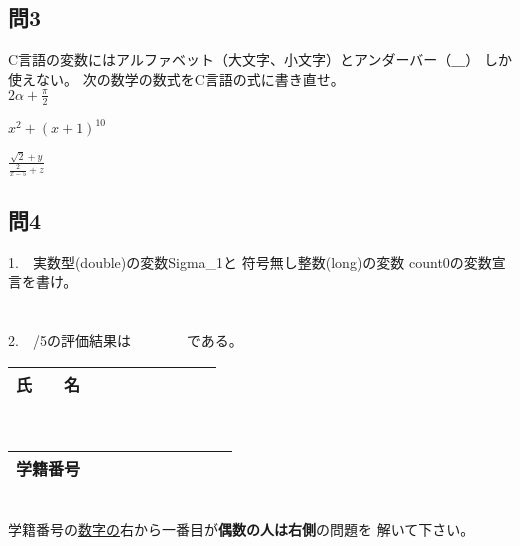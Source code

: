 \documentclass[a4j]{jarticle}
\begin{document}
\begin{multicols*}{2}
\subsection*{問3}
C言語の変数にはアルファベット（大文字、小文字）とアンダーバー（＿）
しか使えない。
次の数学の数式をC言語の式に書き直せ。\\

$2\alpha+\frac{\pi}{2}$

$x^2+(x+1)^{10}$

$\frac{\sqrt{2}+y}{\frac{2}{x-5}+z}$




\subsection*{問4}


1.　実数型({\ttfamily double})の変数{\ttfamily Sigma\_1}と
符号無し整数({\ttfamily long})の変数
{\ttfamily count0}の変数宣言を書け。\\
\\
\\


2.　{/5}の評価結果は　　　　である。


%
%
%

\ifnum {}
\else
\vspace{2cm}
\fi









\noindent
\begin{tabular}[t]{|c|cccccccc|}\hline
氏　　名 & & & & & & & & \\ \hline
\end{tabular}\\
\begin{tabular}[t]{|c|c|c|c|c|c|c|c|c|c|}\hline
学籍番号 & & & & & & & & \\ \hline
\end{tabular}\\
学籍番号の\underline{数字の}右から一番目が{\bfseries 偶数の人は右側}の問題を
解いて下さい。
\vspace{-5ex}





\end{multicols*}
\end{document}
